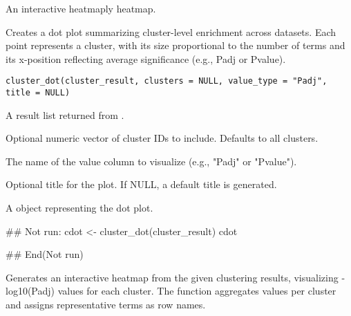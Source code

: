\documentclass[a4paper]{book}
\begin{document}
%
\begin{Value}
An interactive heatmaply heatmap.
\end{Value}
%
\begin{Description}
Creates a dot plot summarizing cluster-level enrichment across datasets.
Each point represents a cluster, with its size proportional to the number
of terms and its x-position reflecting average significance (e.g., Padj or Pvalue).
\end{Description}
%
\begin{Usage}
\begin{verbatim}
cluster_dot(cluster_result, clusters = NULL, value_type = "Padj", title = NULL)
\end{verbatim}
\end{Usage}
%
\begin{Arguments}
\begin{ldescription}
\item[\code{cluster\_result}] A result list returned from .

\item[\code{clusters}] Optional numeric vector of cluster IDs to include. Defaults to all clusters.

\item[\code{value\_type}] The name of the value column to visualize (e.g., "Padj" or "Pvalue").

\item[\code{title}] Optional title for the plot. If NULL, a default title is generated.
\end{ldescription}
\end{Arguments}
%
\begin{Value}
A  object representing the dot plot.
\end{Value}
%
\begin{Examples}
\begin{ExampleCode}
## Not run: 
cdot <- cluster_dot(cluster_result)
cdot

## End(Not run)
\end{ExampleCode}
\end{Examples}
%
\begin{Description}
Generates an interactive heatmap from the given clustering results,
visualizing -log10(Padj) values for each cluster. The function aggregates
values per cluster and assigns representative terms as row names.
\end{Description}
\end{document}
